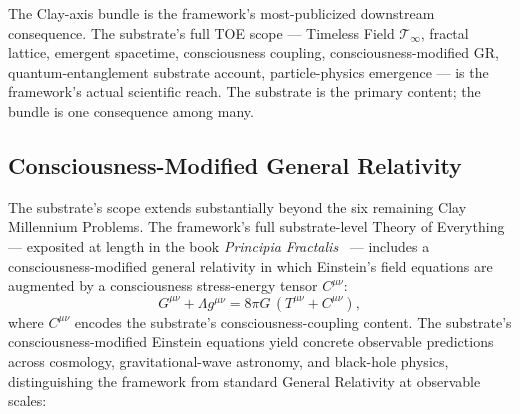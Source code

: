 \documentclass[11pt,a4paper]{amsart}
\theoremstyle{plain}
\theoremstyle{definition}
\begin{document}
The Clay-axis bundle is the framework's most-publicized downstream consequence. The substrate's full TOE scope --- Timeless Field $\mathcal{T}_\infty$, fractal lattice, emergent spacetime, consciousness coupling, consciousness-modified GR, quantum-entanglement substrate account, particle-physics emergence --- is the framework's actual scientific reach. The substrate is the primary content; the bundle is one consequence among many.

\subsection{Consciousness-Modified General Relativity}\label{subsec:consciousness-modified-relativity}

The substrate's scope extends substantially beyond the six remaining Clay Millennium Problems. The framework's full substrate-level Theory of Everything --- exposited at length in the book \emph{Principia Fractalis}~\cite{cohen2026book} --- includes a consciousness-modified general relativity in which Einstein's field equations are augmented by a consciousness stress-energy tensor $C^{\mu\nu}$:
\[
G^{\mu\nu} + \Lambda g^{\mu\nu} = 8\pi G\,(T^{\mu\nu} + C^{\mu\nu}),
\]
where $C^{\mu\nu}$ encodes the substrate's consciousness-coupling content. The substrate's consciousness-modified Einstein equations yield concrete observable predictions across cosmology, gravitational-wave astronomy, and black-hole physics, distinguishing the framework from standard General Relativity at observable scales:
\end{document}
